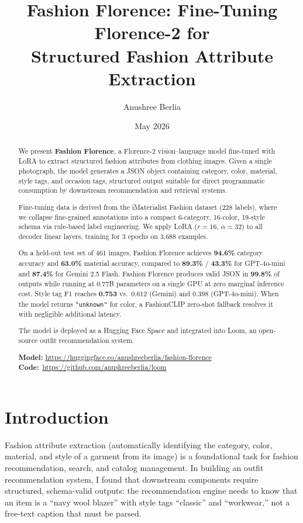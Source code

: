 \documentclass[10pt,twocolumn]{article}
\title{Fashion Florence: Fine-Tuning Florence-2 for\\Structured Fashion Attribute Extraction}
\author{
  Anushree Berlia
}
\date{May 2026}
\begin{document}
\maketitle

\begin{abstract}
We present \textbf{Fashion Florence}, a Florence-2 vision--language model
fine-tuned with LoRA to extract structured fashion attributes from clothing
images.  Given a single photograph, the model generates a JSON object
containing category, color, material, style tags, and occasion
tags, structured output suitable for direct programmatic consumption by
downstream recommendation and retrieval systems.

Fine-tuning data is derived from the iMaterialist Fashion dataset (228
labels), where we collapse fine-grained annotations into a compact 6-category,
16-color, 19-style schema via rule-based label engineering.  We apply LoRA
($r{=}16$, $\alpha{=}32$) to all decoder linear layers, training for 3 epochs
on 3,688 examples.

On a held-out test set of 461 images, Fashion Florence achieves
\textbf{94.6\%} category accuracy and \textbf{63.0\%} material accuracy,
compared to \textbf{89.3\%} / \textbf{43.3\%} for GPT-4o-mini and
\textbf{87.4\%} for Gemini 2.5 Flash.  Fashion Florence produces valid JSON
in \textbf{99.8\%} of outputs while running at 0.77B parameters on a single
GPU at zero marginal inference cost.  Style tag F1 reaches \textbf{0.753}
vs.\ 0.612 (Gemini) and 0.398 (GPT-4o-mini).  When the model returns \texttt{"unknown"} for color, a
FashionCLIP zero-shot fallback resolves it with negligible additional
latency.

The model is deployed as a Hugging Face Space and integrated into Loom, an
open-source outfit recommendation system.

\smallskip\noindent
\textbf{Model:} \url{https://huggingface.co/anushreeberlia/fashion-florence}\\
\textbf{Code:}\;\, \url{https://github.com/anushreeberlia/loom}
\end{abstract}

\section{Introduction}
\label{sec:intro}

Fashion attribute extraction (automatically identifying the category, color,
material, and style of a garment from its image) is a foundational task for
fashion recommendation, search, and catalog management.  In building an
outfit recommendation system, I found that downstream components require
structured, schema-valid outputs: the recommendation engine
needs to know that an item is a ``navy wool blazer'' with style tags
``classic'' and ``workwear,'' not a free-text caption that must be parsed.
\end{document}
